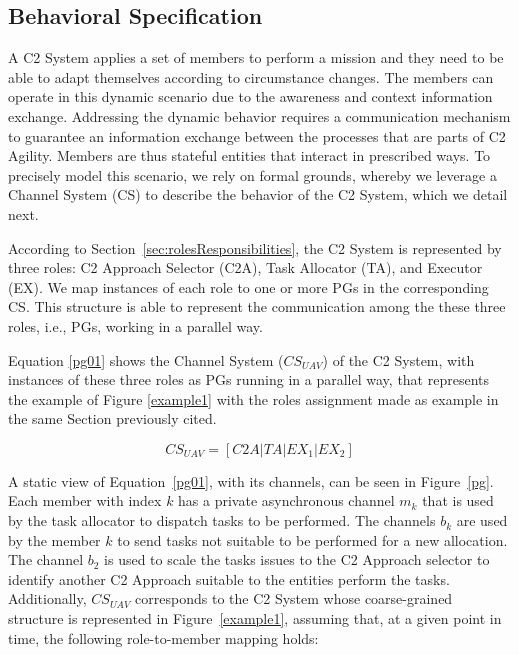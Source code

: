 \subsection{Behavioral Specification} \label{sec:behavior}

A C2 System applies a set of members to perform a mission and they need to be able to adapt themselves according to circumstance changes. The members can operate in this dynamic scenario due to the awareness and context information exchange. Addressing the dynamic behavior requires a communication mechanism to guarantee an information exchange between the processes that are parts of C2 Agility. Members are thus stateful entities that interact in prescribed ways.  To precisely model this scenario, we rely on formal grounds, whereby we leverage a Channel System (CS) to describe the behavior of the C2 System, which we detail next. 

According to Section~\ref{sec:rolesResponsibilities}, the C2 System is represented by three roles: C2 Approach Selector (C2A), Task Allocator (TA), and Executor (EX). We map instances of each role to one or more PGs in the corresponding CS. This structure is able to represent the communication among the these three roles, i.e., PGs, working in a parallel way.

Equation \eqref{pg01} shows the Channel System ($CS_{UAV}$) of the C2 System, with instances of these three roles as PGs running in a parallel way, that represents the example of Figure \ref{example1} with the roles assignment made as example in the same Section previously cited.

\begin{equation}
\label{pg01}
    CS_{UAV} = [C2A | TA | EX_1 | EX_2]
\end{equation}

A static view of Equation~\eqref{pg01}, with its channels, can be seen in Figure~\ref{pg}. Each member with index $k$ has a private asynchronous channel $m_k$ that is used by the task allocator to dispatch tasks to be performed. The channels $b_k$ are used by the member $k$ to send tasks not suitable to be performed for a new allocation. The channel $b_2$ is used to scale the tasks issues to the C2 Approach selector to identify another C2 Approach suitable to the entities perform the tasks.  Additionally, $CS_{UAV}$ corresponds to the C2 System whose coarse-grained structure is represented in Figure~\ref{example1}, assuming that, at a given point in time, the following role-to-member mapping holds: 

